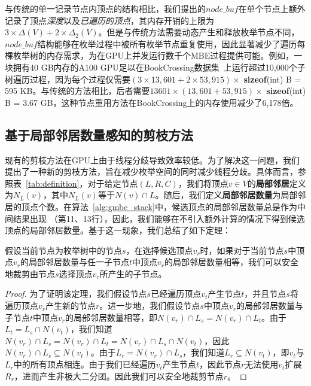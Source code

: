 与传统的单一记录节点内顶点的结构相比，我们提出的$node\_buf$在单个节点上额外记录了顶点\textit{深度}以及\textit{已遍历的顶点}，其内存开销的上限为$3 \times \Delta(V) + 2 \times \Delta_2(V)$。但是与传统方法需要动态产生和释放枚举节点不同，$node\_buf$结构能够在枚举过程中被所有枚举节点重复使用，因此显著减少了遍历每棵枚举树的内存需求，为在GPU上并发运行数千个MBE过程提供可能。例如，一块拥有40 GB内存的A100 GPU足以在BookCrossing数据集~\cite{konect}上运行超过10,000个子树遍历过程，因为每个过程仅需要$(3 \times 13,601 + 2 \times 53,915) \times$ \textbf{sizeof}(int) B = 595 KB。与传统的方法相比，后者需要$13601 \times (13,601 + 53,915)\times$ \textbf{sizeof}(int) B = 3.67 GB，这种节点重用方法在BookCrossing上的内存使用减少了6,178倍。

\subsection{基于局部邻居数量感知的剪枝方法}
\label{subsec:gmbe_prune}

现有的剪枝方法在GPU上由于线程分歧导致效率较低。为了解决这一问题，我们提出了一种新的剪枝方法，旨在减少枚举空间的同时减少线程分歧。具体而言，参照表~\ref{tab:definition}，对于给定节点$(L, R, C)$，我们将顶点$v \in V$的\textbf{局部邻居}定义为$N_L(v)$，其中$N_L(v)$等于$N(v) \cap L$。随后，我们定义\textbf{局部邻居数量}为局部邻居的顶点个数。在算法~\ref{alg:gmbe_stack}中，候选顶点的局部邻居数量总是作为中间结果出现 （第11、13行），因此，我们能够在不引入额外计算的情况下得到候选顶点的局部邻居数量。基于这一现象，我们总结了如下定理：

\begin{theorem}
  假设当前节点为枚举树中的节点$s$，在选择候选顶点$v_r$时，如果对于当前节点$s$中顶点$v_r$的局部邻居数量与任一子节点$t$中顶点$v_r$的局部邻居数量相等，我们可以安全地裁剪由节点$s$选择顶点$v_r$所产生的子节点。
  \label{theorem:gmbe_prune}
\end{theorem}

\begin{proof}
  为了证明该定理，我们假设节点$s$已经遍历顶点$v_t$产生节点$t$，并且节点$s$将遍历顶点$v_r$产生新的节点$r$。进一步地，我们假设节点$s$中顶点$v_r$的局部邻居数量与子节点$t$中顶点$v_r$的局部邻居数量相等，即$N(v_r) \cap L_s =N(v_r) \cap L_t$。由于$L_t = L_s\cap N(v_t)$，我们知道$N(v_r) \cap L_s =N(v_r) \cap L_t= N(v_r) \cap L_s\cap N(v_t)$，因此$N(v_r) \cap L_s \subseteq N(v_t)$。由于$L_r = N(v_r)\cap L_s$，我们知道$L_r\subseteq N(v_t)$，即$v_t$与$L_r$中的所有顶点相连。由于我们已经遍历$v_t$产生节点$t$，因此节点$r$无法使用$v_t$扩展$R_r$，进而产生非极大二分团。因此我们可以安全地裁剪节点$r$。

\end{proof}

